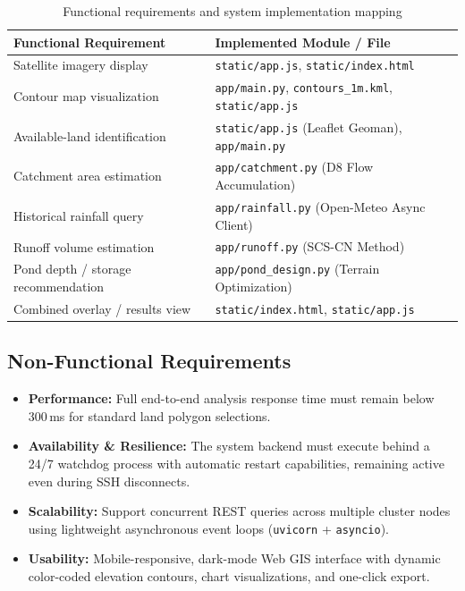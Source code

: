 \documentclass[11pt,a4paper]{article}
\begin{document}
\begin{table}[h]
\centering
\caption{Functional requirements and system implementation mapping}
\label{tab:requirements}
\vspace{0.2cm}
\begin{tabular}{p{6.5cm}p{7.5cm}}
\toprule
\textbf{Functional Requirement} & \textbf{Implemented Module / File} \\
\midrule
Satellite imagery display & \texttt{static/app.js}, \texttt{static/index.html} \\
Contour map visualization & \texttt{app/main.py}, \texttt{contours\_1m.kml}, \texttt{static/app.js} \\
Available-land identification & \texttt{static/app.js} (Leaflet Geoman), \texttt{app/main.py} \\
Catchment area estimation & \texttt{app/catchment.py} (D8 Flow Accumulation) \\
Historical rainfall query & \texttt{app/rainfall.py} (Open-Meteo Async Client) \\
Runoff volume estimation & \texttt{app/runoff.py} (SCS-CN Method) \\
Pond depth / storage recommendation & \texttt{app/pond\_design.py} (Terrain Optimization) \\
Combined overlay / results view & \texttt{static/index.html}, \texttt{static/app.js} \\
\bottomrule
\end{tabular}
\end{table}

\subsection{Non-Functional Requirements}
\begin{itemize}
    \item \textbf{Performance:} Full end-to-end analysis response time must remain below 300\,ms for standard land polygon selections.
    \item \textbf{Availability \& Resilience:} The system backend must execute behind a 24/7 watchdog process with automatic restart capabilities, remaining active even during SSH disconnects.
    \item \textbf{Scalability:} Support concurrent REST queries across multiple cluster nodes using lightweight asynchronous event loops (\texttt{uvicorn} + \texttt{asyncio}).
    \item \textbf{Usability:} Mobile-responsive, dark-mode Web GIS interface with dynamic color-coded elevation contours, chart visualizations, and one-click export.
\end{itemize}
\end{document}
